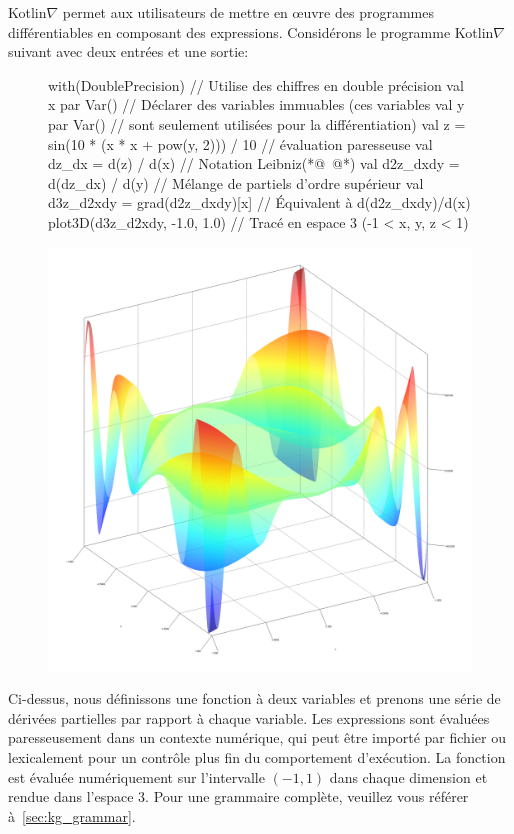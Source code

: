 Kotlin$\nabla$ permet aux utilisateurs de mettre en œuvre des programmes différentiables en composant des expressions. Considérons le programme Kotlin$\nabla$ suivant avec deux entrées et une sortie:
%
\begin{figure}[H] \label{fig:basic_kotlingrad}
\begin{unbreakablekotlin}
with(DoublePrecision) { // Utilise des chiffres en double précision
  val x par Var() // Déclarer des variables immuables (ces variables
  val y par Var() // sont seulement utilisées pour la différentiation)
  val z = sin(10 * (x * x + pow(y, 2))) / 10 // évaluation paresseuse
  val dz_dx = d(z) / d(x) // Notation Leibniz(*@~\citep{christianson2012leibniz}@*)
  val d2z_dxdy = d(dz_dx) / d(y) // Mélange de partiels d'ordre supérieur
  val d3z_d2xdy = grad(d2z_dxdy)[x] // Équivalent à d(d2z_dxdy)/d(x)
  plot3D(d3z_d2xdy, -1.0, 1.0) // Tracé en espace 3 (-1 < x, y, z < 1)
}
\end{unbreakablekotlin}
\includegraphics[scale=0.43]{../figures/plot_result.png}
\end{figure}
%
Ci-dessus, nous définissons une fonction à deux variables et prenons une série de dérivées partielles par rapport à chaque variable. Les expressions sont évaluées paresseusement dans un contexte numérique, qui peut être importé par fichier ou lexicalement pour un contrôle plus fin du comportement d'exécution. La fonction est évaluée numériquement sur l'intervalle $(-1, 1)$ dans chaque dimension et rendue dans l'espace 3. Pour une grammaire complète, veuillez vous référer à~\autoref{sec:kg_grammar}.
